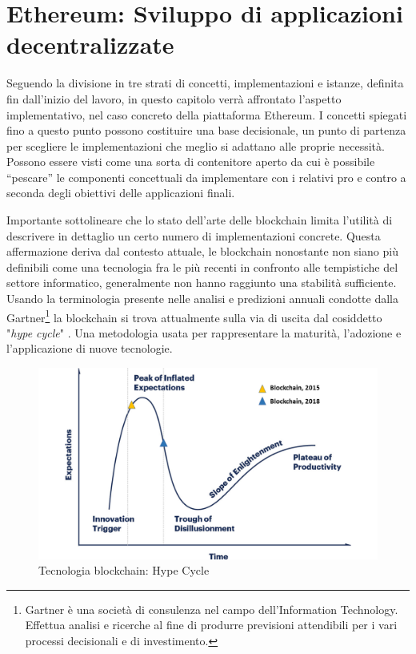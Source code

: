 \chapter{Ethereum: Sviluppo di applicazioni decentralizzate}
\label{ch:ethereum}

Seguendo la divisione in tre strati di concetti, implementazioni e istanze, definita fin dall'inizio del lavoro, in questo capitolo verrà affrontato l'aspetto implementativo, nel caso concreto della piattaforma Ethereum. I concetti spiegati fino a questo punto possono costituire una base decisionale, un punto di partenza per scegliere le implementazioni che meglio si adattano alle proprie necessità. Possono essere visti come una sorta di contenitore aperto da cui è possibile “pescare” le componenti concettuali da implementare con i relativi pro e contro a seconda degli obiettivi delle applicazioni finali. 

Importante sottolineare che lo stato dell'arte delle blockchain limita l’utilità di descrivere in dettaglio un certo numero di implementazioni concrete. Questa affermazione deriva dal contesto attuale, le blockchain nonostante non siano più definibili come una tecnologia fra le più recenti in confronto alle tempistiche del settore informatico, generalmente non hanno raggiunto una stabilità sufficiente. Usando la terminologia presente nelle analisi e predizioni annuali condotte dalla Gartner\footnote{Gartner è una società di consulenza nel campo dell'Information Technology. Effettua analisi e ricerche al fine di produrre previsioni attendibili per i vari processi decisionali e di investimento.} la blockchain si trova attualmente sulla via di uscita dal cosiddetto "\emph{hype cycle}" \smallskip {}. Una metodologia usata per rappresentare la maturità, l'adozione e l'applicazione di nuove tecnologie.

\begin{figure}[H]
\centering
\includegraphics[width=1\textwidth]{immagini/blockchainHype.png}
\caption{Tecnologia blockchain: Hype Cycle}
\label{fig:HypeCycleBlockchain}
\end{figure}

